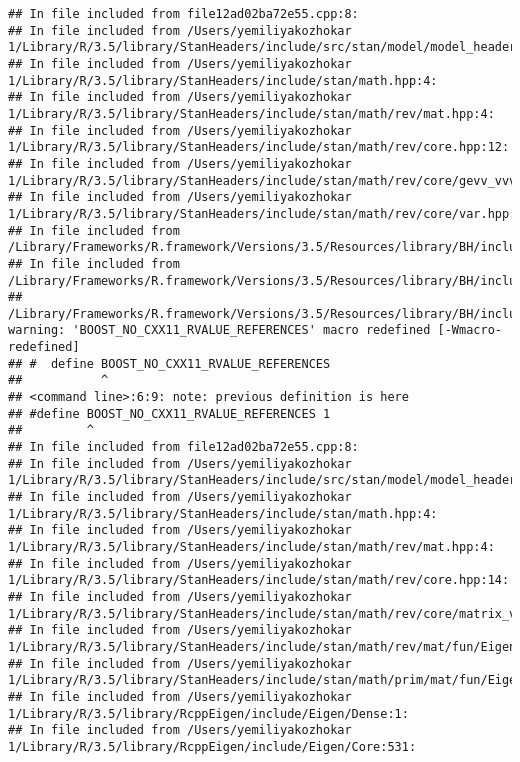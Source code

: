 \documentclass[]{article}
\begin{document}
\begin{verbatim}
## In file included from file12ad02ba72e55.cpp:8:
## In file included from /Users/yemiliyakozhokar 1/Library/R/3.5/library/StanHeaders/include/src/stan/model/model_header.hpp:4:
## In file included from /Users/yemiliyakozhokar 1/Library/R/3.5/library/StanHeaders/include/stan/math.hpp:4:
## In file included from /Users/yemiliyakozhokar 1/Library/R/3.5/library/StanHeaders/include/stan/math/rev/mat.hpp:4:
## In file included from /Users/yemiliyakozhokar 1/Library/R/3.5/library/StanHeaders/include/stan/math/rev/core.hpp:12:
## In file included from /Users/yemiliyakozhokar 1/Library/R/3.5/library/StanHeaders/include/stan/math/rev/core/gevv_vvv_vari.hpp:5:
## In file included from /Users/yemiliyakozhokar 1/Library/R/3.5/library/StanHeaders/include/stan/math/rev/core/var.hpp:7:
## In file included from /Library/Frameworks/R.framework/Versions/3.5/Resources/library/BH/include/boost/math/tools/config.hpp:13:
## In file included from /Library/Frameworks/R.framework/Versions/3.5/Resources/library/BH/include/boost/config.hpp:39:
## /Library/Frameworks/R.framework/Versions/3.5/Resources/library/BH/include/boost/config/compiler/clang.hpp:200:11: warning: 'BOOST_NO_CXX11_RVALUE_REFERENCES' macro redefined [-Wmacro-redefined]
## #  define BOOST_NO_CXX11_RVALUE_REFERENCES
##           ^
## <command line>:6:9: note: previous definition is here
## #define BOOST_NO_CXX11_RVALUE_REFERENCES 1
##         ^
## In file included from file12ad02ba72e55.cpp:8:
## In file included from /Users/yemiliyakozhokar 1/Library/R/3.5/library/StanHeaders/include/src/stan/model/model_header.hpp:4:
## In file included from /Users/yemiliyakozhokar 1/Library/R/3.5/library/StanHeaders/include/stan/math.hpp:4:
## In file included from /Users/yemiliyakozhokar 1/Library/R/3.5/library/StanHeaders/include/stan/math/rev/mat.hpp:4:
## In file included from /Users/yemiliyakozhokar 1/Library/R/3.5/library/StanHeaders/include/stan/math/rev/core.hpp:14:
## In file included from /Users/yemiliyakozhokar 1/Library/R/3.5/library/StanHeaders/include/stan/math/rev/core/matrix_vari.hpp:4:
## In file included from /Users/yemiliyakozhokar 1/Library/R/3.5/library/StanHeaders/include/stan/math/rev/mat/fun/Eigen_NumTraits.hpp:4:
## In file included from /Users/yemiliyakozhokar 1/Library/R/3.5/library/StanHeaders/include/stan/math/prim/mat/fun/Eigen.hpp:4:
## In file included from /Users/yemiliyakozhokar 1/Library/R/3.5/library/RcppEigen/include/Eigen/Dense:1:
## In file included from /Users/yemiliyakozhokar 1/Library/R/3.5/library/RcppEigen/include/Eigen/Core:531:

\end{verbatim}
\end{document}
